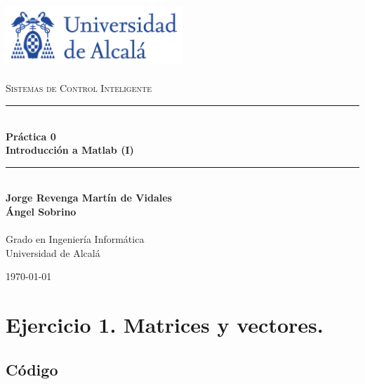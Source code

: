 \documentclass[a4paper, 12pt]{article}
\newcommand{\HRule}{\rule{\linewidth}{0.5mm}}
\begin{document}
	\begin{titlepage}
		\begin{center}
			\includegraphics[width=0.5\textwidth]{figures/logoUAH.png}~\\[2cm]
			
			\textsc{\Large \\Sistemas de Control Inteligente}\\[2cm]
			
			\HRule \\[0.4cm]
			{\LARGE \bfseries Práctica 0 \\ Introducción a Matlab (I) \\[0.4cm]}
			\HRule \\[3cm]
			
			\large\textbf{Jorge Revenga Martín de Vidales}\\
			\large\textbf{Ángel Sobrino}\\
			\large\textbf{}\\ Grado en Ingeniería Informática \\ Universidad de Alcalá
			
			\vfill
			
			{\large \today}
		\end{center}
	\end{titlepage}
	
	\pagestyle{fancy}
	\fancyhf{} %
	\fancyfoot[RO,LE]{\thepage}  %
	\newpage
	
	\thispagestyle{plain}
	\tableofcontents
	\newpage
	
	\section{Ejercicio 1. Matrices y vectores.}
	
	\subsection{Código}
	\inputminted[fontsize=\scriptsize, linenos, breaklines=true, xleftmargin=0.75cm, frame=lines]{matlab}{code/Ejercicio1.m}
	\newpage
\end{document}
